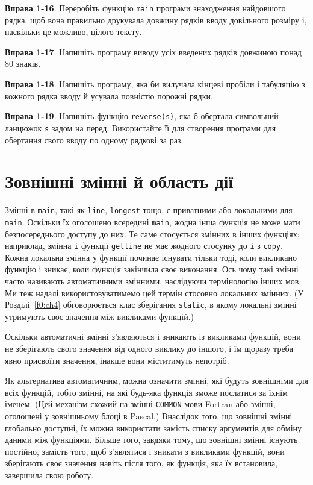 \documentclass[a4paper,12pt]{book}
\begin{document}
  \textbf{Вправа 1-16}. Переробіть функцію \texttt{main} програми знаходження найдовшого
  рядка, щоб вона правильно друкувала довжину рядків вводу довільного розміру і, наскільки
  це можливо, цілого тексту.

  \textbf{Вправа 1-17}. Напишіть програму виводу усіх введених рядків довжиною понад 80
  знаків.

  \textbf{Вправа 1-18}. Напишіть програму, яка би вилучала кінцеві пробіли і табуляцію з
  кожного рядка вводу й усувала повністю порожні рядки.

  \textbf{Вправа 1-19}. Напишіть функцію \texttt{reverse(s)}, яка б обертала символьний
  ланцюжок \texttt{s} задом на перед. Використайте її для створення програми для обертання
  свого вводу по одному рядкові за раз.

\section{Зовнішні змінні й область дії}


  Змінні в \texttt{main}, такі як \texttt{line}, \texttt{longest} тощо, є
  приватними або локальними для \texttt{main}. Оскільки їх оголошено всередині
  \texttt{main}, жодна інша функція не може мати безпосереднього доступу до них. Те саме
  стосується змінних в інших функціях; наприклад, змінна \texttt{i} функції
  \texttt{getline} не має жодного стосунку до \texttt{i} з \texttt{copy}. Кожна локальна
  змінна у функції починає існувати тільки тоді, коли викликано функцію і зникає, коли
  функція закінчила своє виконання. Ось чому такі змінні часто називають автоматичними
  змінними, наслідуючи термінологію інших мов. Ми теж надалі використовуватимемо цей
  термін стосовно локальних змінних. (У Розділі~\ref{f0:ch4} обговорюється клас
  зберігання \texttt{static}, в якому локальні змінні утримують своє значення між
  викликами функцій.)

  Оскільки автоматичні змінні з'являються і зникають із викликами функцій, вони не
  зберігають свого значення від одного виклику до іншого, і їм щоразу треба явно присвоїти
  значення, інакше вони міститимуть непотріб.

  Як альтернатива автоматичним, можна означити змінні, які будуть зовнішніми для всіх
  функцій, тобто змінні, на які будь-яка функція зможе послатися за їхнім іменем. (Цей
  механізм схожий на змінні \texttt{COMMON} мови Fortran або змінні, оголошені у
  зовнішньому блоці в Pascal.) Внаслідок того, що зовнішні змінні глобально доступні, їх
  можна використати замість списку аргументів для обміну даними між функціями. Більше
  того, завдяки тому, що зовнішні змінні існують постійно, замість того, щоб з'являтися і
  зникати з викликами функцій, вони зберігають своє значення навіть після того, як
  функція, яка їх встановила, завершила свою роботу.
\end{document}
